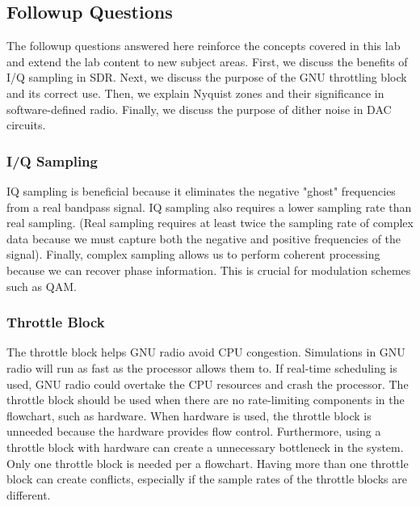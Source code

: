 \documentclass{article}
\begin{document}
\subsection{Followup Questions}

The followup questions answered here reinforce the concepts covered in this lab and extend the lab content to new subject areas. First, we discuss the benefits of I/Q sampling in SDR. Next, we discuss the purpose of the GNU throttling block and its correct use. Then, we explain Nyquist zones and their significance in software-defined radio. Finally, we discuss the purpose of dither noise in DAC circuits.



	\subsubsection{I/Q Sampling}
	IQ sampling is beneficial because it eliminates the negative "ghost" frequencies from a real bandpass signal. IQ sampling also requires a lower sampling rate than real sampling. (Real sampling requires at least twice the sampling rate of complex data because we must capture both the negative and positive frequencies of the signal). Finally, complex sampling allows us to perform coherent processing because we can recover phase information. This is crucial for modulation schemes such as QAM.
	

	\subsubsection{Throttle Block}
	The throttle block helps GNU radio avoid CPU congestion. Simulations in GNU radio will run as fast as the processor allows them to. If real-time scheduling is used, GNU radio could overtake the CPU resources and crash the processor. The throttle block should be used when there are no rate-limiting components in the flowchart, such as hardware. When hardware is used, the throttle block is unneeded because the hardware provides flow control. Furthermore, using a throttle block with hardware can create a unnecessary bottleneck in the system. Only one throttle block is needed per a flowchart. Having more than one throttle block can create conflicts, especially if the sample rates of the throttle blocks are different.
		
\end{document}
